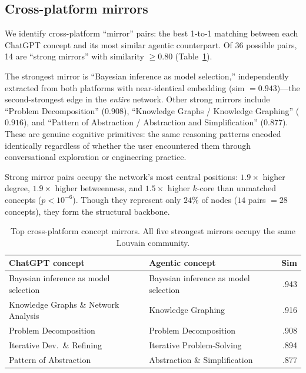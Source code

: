 \documentclass[11pt,twocolumn]{article}
\begin{document}
\subsection{Cross-platform mirrors}
\label{sec:results:mirrors}

We identify cross-platform ``mirror'' pairs: the best 1-to-1 matching between each ChatGPT concept and its most similar agentic counterpart.
Of 36 possible pairs, 14 are ``strong mirrors'' with similarity $\geq 0.80$ (Table~\ref{tab:mirrors}).

The strongest mirror is ``Bayesian inference as model selection,'' independently extracted from both platforms with near-identical embedding (sim $= 0.943$)---the second-strongest edge in the \emph{entire} network.
Other strong mirrors include ``Problem Decomposition'' ($0.908$), ``Knowledge Graphs / Knowledge Graphing'' ($0.916$), and ``Pattern of Abstraction / Abstraction and Simplification'' ($0.877$).
These are genuine cognitive primitives: the same reasoning patterns encoded identically regardless of whether the user encountered them through conversational exploration or engineering practice.

Strong mirror pairs occupy the network's most central positions: $1.9\times$ higher degree, $1.9\times$ higher betweenness, and $1.5\times$ higher $k$-core than unmatched concepts ($p < 10^{-6}$).
Though they represent only $24\%$ of nodes ($14$ pairs $= 28$ concepts), they form the structural backbone.

\begin{table}[t]
  \centering
  \caption{Top cross-platform concept mirrors.  All five strongest mirrors occupy the same Louvain community.}
  \label{tab:mirrors}
  \begin{tabular}{p{2.4cm}p{2.4cm}r}
    \toprule
    ChatGPT concept & Agentic concept & Sim \\
    \midrule
    Bayesian inference as model selection & Bayesian inference as model selection & .943 \\
    Knowledge Graphs \& Network Analysis & Knowledge Graphing & .916 \\
    Problem Decomposition & Problem Decomposition & .908 \\
    Iterative Dev.\ \& Refining & Iterative Problem-Solving & .894 \\
    Pattern of Abstraction & Abstraction \& Simplification & .877 \\
    \bottomrule
  \end{tabular}
\end{table}
\end{document}
